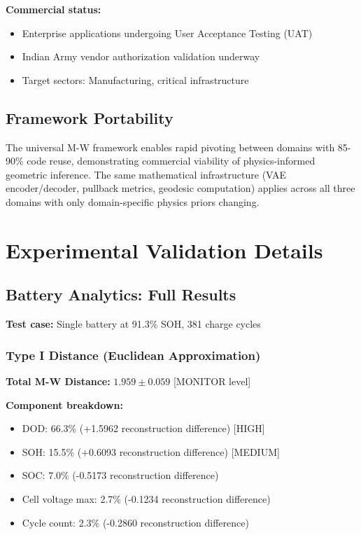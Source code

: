 \documentclass[11pt,a4paper]{article}
\begin{document}
\textbf{Commercial status:}
\begin{itemize}
\item Enterprise applications undergoing User Acceptance Testing (UAT)
\item Indian Army vendor authorization validation underway
\item Target sectors: Manufacturing, critical infrastructure
\end{itemize}

\subsection{Framework Portability}

The universal M-W framework enables rapid pivoting between domains with 85-90\% code reuse, demonstrating commercial viability of physics-informed geometric inference. The same mathematical infrastructure (VAE encoder/decoder, pullback metrics, geodesic computation) applies across all three domains with only domain-specific physics priors changing.

\section{Experimental Validation Details}

\subsection{Battery Analytics: Full Results}

\textbf{Test case:} Single battery at 91.3\% SOH, 381 charge cycles

\subsubsection{Type I Distance (Euclidean Approximation)}

\textbf{Total M-W Distance:} $1.959 \pm 0.059$ [MONITOR level]

\textbf{Component breakdown:}
\begin{itemize}
\item DOD: 66.3\% (+1.5962 reconstruction difference) [HIGH]
\item SOH: 15.5\% (+0.6093 reconstruction difference) [MEDIUM]
\item SOC: 7.0\% (-0.5173 reconstruction difference)
\item Cell voltage max: 2.7\% (-0.1234 reconstruction difference)
\item Cycle count: 2.3\% (-0.2860 reconstruction difference)
\end{itemize}
\end{document}
